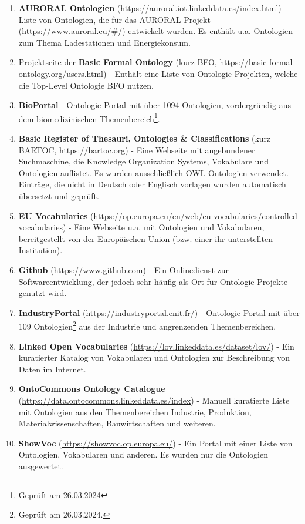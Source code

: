 \documentclass{article}
\begin{document}
\begin{enumerate}
    \item \textbf{AURORAL Ontologien} (\url{https://auroral.iot.linkeddata.es/index.html}) - Liste von Ontologien, die für das AURORAL Projekt (\url{https://www.auroral.eu/#/}) entwickelt wurden. Es enthält u.a. Ontologien zum Thema Ladestationen und Energiekonsum.
    \item Projektseite der \textbf{Basic Formal Ontology} (kurz BFO, \url{https://basic-formal-ontology.org/users.html}) - Enthält eine Liste von Ontologie-Projekten, welche die Top-Level Ontologie BFO nutzen.
    \item \textbf{BioPortal} - Ontologie-Portal mit über 1094 Ontologien, vordergründig aus dem biomedizinischen Themenbereich\footnote{Geprüft am 26.03.2024}.
    \item \textbf{Basic Register of Thesauri, Ontologies \& Classifications} (kurz BARTOC, \url{https://bartoc.org}) - Eine Webseite mit angebundener Suchmaschine, die Knowledge Organization Systems, Vokabulare und Ontologien auflistet. Es wurden ausschließlich OWL Ontologien verwendet. Einträge, die nicht in Deutsch oder Englisch vorlagen wurden automatisch übersetzt und geprüft.
    \item \textbf{EU Vocabularies} (\url{https://op.europa.eu/en/web/eu-vocabularies/controlled-vocabularies}) - Eine Webseite u.a. mit Ontologien und Vokabularen, bereitgestellt von der Europäischen Union (bzw. einer ihr unterstellten Institution).
    \item \textbf{Github} (\url{https://www.github.com}) - Ein Onlinedienst zur Softwareentwicklung, der jedoch sehr häufig als Ort für Ontologie-Projekte genutzt wird.
    \item \textbf{IndustryPortal} (\url{https://industryportal.enit.fr/}) - Ontologie-Portal mit über 109 Ontologien\footnote{Geprüft am 26.03.2024.} aus der Industrie und angrenzenden Themenbereichen.
    \item \textbf{Linked Open Vocabularies} (\url{https://lov.linkeddata.es/dataset/lov/}) - Ein kuratierter Katalog von Vokabularen und Ontologien zur Beschreibung von Daten im Internet.
    \item \textbf{OntoCommons Ontology Catalogue} (\url{https://data.ontocommons.linkeddata.es/index}) - Manuell kuratierte Liste mit Ontologien aus den Themenbereichen Industrie, Produktion, Materialwissenschaften, Bauwirtschaften und weiteren.
    \item \textbf{ShowVoc} (\url{https://showvoc.op.europa.eu/}) - Ein Portal mit einer Liste von Ontologien, Vokabularen und anderen. Es wurden nur die Ontologien ausgewertet.
\end{enumerate}
\end{document}
